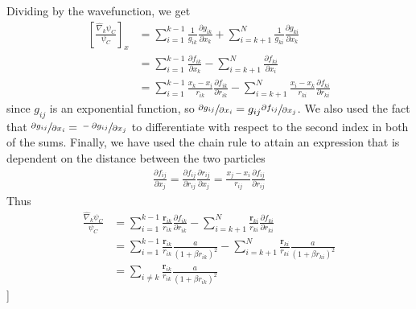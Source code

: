 \documentclass[twocolumns, a4paper,11pt,fleqn]{extarticle}
\newcommand{\eq}[1]{{\small\begin{align*}#1\end{align*}}}
\renewcommand\vec[1]{\boldsymbol{\mathbf{#1}}}
\newcommand{\op}[1]{\hat{#1}}
\begin{document}
{Dividing by the wavefunction, we get
\eq{
  \left[\frac{\op\nabla_k\psi_C}{\psi_C}\right]_x
  &=\sum_{i=1}^{k-1}\frac{1}{g_{ik}}\frac{\partial g_{ik}}{\partial x_k}  
  + \sum_{i=k+1}^{N}\frac{1}{g_{ki}}\frac{\partial g_{ki}}{\partial x_k} \\
  &=\sum_{i=1}^{k-1}\frac{\partial f_{ik}}{\partial x_k}  
  - \sum_{i=k+1}^{N}\frac{\partial f_{ki}}{\partial x_i}\\
  &=\sum_{i=1}^{k-1}\frac{x_k-x_i}{r_{ik}}\frac{\partial f_{ik}}{\partial r_{ik}}  
  - \sum_{i=k+1}^{N}\frac{x_i-x_k}{r_{ki}}\frac{\partial f_{ki}}{\partial r_{ki}}
}
since $g_{ij}$ is an exponential function, so
$\sfrac{\partial g_{ij}}{\partial x_i} = g_{ij} \sfrac{\partial f_{ij}}{\partial x_j}$.
We also used the fact that $\sfrac{\partial g_{ij}}{\partial x_i} = \sfrac{-\partial g_{ij}}{\partial x_j}$ to differentiate with respect to the second index in both of the sums.
Finally, we have used the chain rule to attain an expression that is dependent
on the distance between the two particles
\eq{
  \frac{\partial f_{ij}}{\partial x_j} 
  = \frac{\partial f_{ij}}{\partial r_{ij}} \frac{\partial r_{ij}}{\partial x_j} 
  = \frac{x_j - x_i}{r_{ij}} \frac{\partial f_{ij}}{\partial r_{ij}}
}
Thus
\eq{
  \frac{\op\nabla_k\psi_C}{\psi_C} &=
    \sum_{i=1}^{k-1}\frac{\vec r_{ik}}{r_{ik}}\frac{\partial f_{ik}}{\partial r_{ik}}  
    - \sum_{i=k+1}^{N}\frac{\vec r_{ki}}{r_{ki}}\frac{\partial f_{ki}}{\partial r_{ki}}\\
    &=\sum_{i=1}^{k-1}\frac{\vec r_{ik}}{r_{ik}}\frac{a}{(1+\beta r_{ik})^2}  
    - \sum_{i=k+1}^{N}\frac{\vec r_{ki}}{r_{ki}}\frac{a}{(1+\beta r_{ki})^2}\\
    &=\sum_{i\neq k}\frac{\vec r_{ik}}{r_{ik}}\frac{a}{(1+\beta r_{ik})^2} 
}
}]
\end{document}

